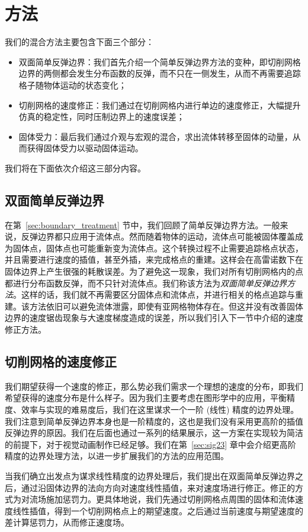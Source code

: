 \section{方法}
我们的混合方法主要包含下面三个部分：
\begin{itemize}
\item 双面简单反弹边界：我们首先介绍一个简单反弹边界方法的变种，即切削网格边界的两侧都会发生分布函数的反弹，而不只在一侧发生，从而不再需要追踪格子随物体运动的状态变化；
\item 切削网格的速度修正：我们通过在切削网格内进行单边的速度修正，大幅提升仿真的稳定性，同时压制边界上的速度误差；
\item 固体受力：最后我们通过介观与宏观的混合，求出流体转移至固体的动量，从而获得固体受力以驱动固体运动。
\end{itemize}

我们将在下面依次介绍这三部分内容。

\subsection{双面简单反弹边界}
在第~\ref{sec:boundary_treatment} 节中，我们回顾了简单反弹边界方法。一般来说，反弹边界都只应用于流体点。然而随着物体的运动，流体点可能被固体覆盖成为固体点，固体点也可能重新变为流体点。这个转换过程不止需要追踪格点状态，并且需要进行速度的插值，甚至外插，来完成格点的重建。这样会在高雷诺数下在固体边界上产生很强的耗散误差。为了避免这一现象，我们对所有切削网格内的点都进行分布函数反弹，而不只针对流体点。我们称该方法为\emph{双面简单反弹边界方法}。这样的话，我们就不再需要区分固体点和流体点，并进行相关的格点追踪与重建。该方法依旧可以避免流体泄露，即使有亚网格物体存在。但这并没有改善固体边界的速度锯齿现象与大速度梯度造成的误差，所以我们引入下一节中介绍的速度修正方法。

\subsection{切削网格的速度修正}
我们期望获得一个速度的修正，那么势必我们需求一个理想的速度的分布，即我们希望获得的速度分布是什么样子。因为我们主要考虑在图形学中的应用，平衡精度、效率与实现的难易度后，我们在这里谋求一个一阶 (线性) 精度的边界处理。我们注意到简单反弹边界本身也是一阶精度的，这也是我们没有采用更高阶的插值反弹边界的原因。我们在后面也通过一系列的结果展示，这一方案在实现较为简洁的前提下，对于视觉动画制作已经足够。我们在第~\ref{sec:sig23} 章中会介绍更高阶精度的边界处理方法，以进一步扩展我们的方法的应用范围。

当我们确立出发点为谋求线性精度的边界处理后，我们提出在双面简单反弹边界之后，通过沿固体边界的法向方向对速度线性插值，来对速度场进行修正。修正的方式为对流场施加惩罚力。更具体地说，我们先通过切削网格点周围的固体和流体速度线性插值，得到一个切削网格点上的期望速度。之后通过当前速度与期望速度的差计算惩罚力，从而修正速度场。

